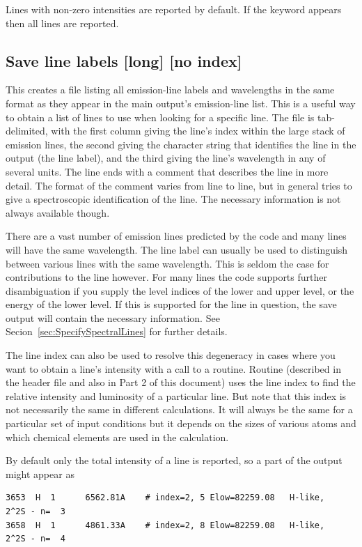 Lines with non-zero intensities are reported by default.  
If the keyword  appears then all lines are reported.

\subsection{Save line labels [long] [no index]}
\label{sec:SaveLineLabels}

This creates a file listing all emission-line labels and wavelengths
in the same format as they appear in the main output's emission-line list.
This is a useful way to obtain a list of lines to use when looking for a
specific line.  The file is tab-delimited, with the first column giving
the line's index within the large stack of emission lines, the second giving
the character string that identifies the line in the output (the line label), and the third giving
the line's wavelength in any of several units.  The line ends with a
comment that describes the line in more detail.  The format of the comment
varies from line to line, but in general tries to give a spectroscopic
identification of the line. The necessary information is not always available though.

There are a vast number of emission lines predicted by the code and many
lines will have the same wavelength.  The line label can usually be used
to distinguish between various lines with the same wavelength. This is seldom
the case for contributions to the line however.  For many lines the code
supports further disambiguation if you supply the level indices of the lower
and upper level, or the energy of the lower level.  If this is supported for
the line in question, the save output will contain the necessary information.
See Secion~\ref{sec:SpecifySpectralLines} for further details.

The line index can also be used
to resolve this degeneracy in cases where you want to obtain a line's
intensity with a call to a routine.
Routine  (described in the
header file  and also in Part 2 of this document)
uses the line index to find the relative intensity and
luminosity of a particular line.
But note that this index is not necessarily the same in different
calculations.  It will always be the same for a particular set of input
conditions but it depends on the sizes of various atoms and which chemical
elements are used in the calculation.

By default only the total intensity of a line is reported, so a
part of the output might appear as
\begin{verbatim}
3653  H  1      6562.81A    # index=2, 5 Elow=82259.08   H-like,   2^2S - n=  3
3658  H  1      4861.33A    # index=2, 8 Elow=82259.08   H-like,   2^2S - n=  4
\end{verbatim}

